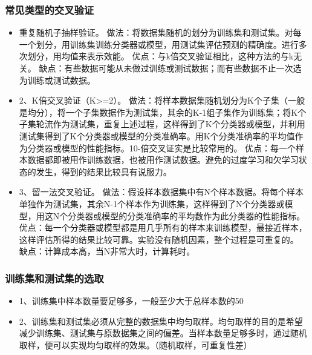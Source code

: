 \documentclass[10pt,a4paper]{ctexbook}
\begin{document}
\subsubsection{常见类型的交叉验证}
\begin{itemize}
\item 重复随机子抽样验证。
    \subitem 做法：将数据集随机的划分为训练集和测试集。对每一个划分，用训练集训练分类器或模型，用测试集评估预测的精确度。进行多次划分，用均值来表示效能。
    \subitem 优点：与k倍交叉验证相比，这种方法的与k无关。
    \subitem 缺点：有些数据可能从未做过训练或测试数据；而有些数据不止一次选为训练或测试数据。
\item 2、K倍交叉验证（K>=2）。
    \subitem 做法：将样本数据集随机划分为K个子集（一般是均分），将一个子集数据作为测试集，其余的K-1组子集作为训练集；将K个子集轮流作为测试集，重复上述过程，这样得到了K个分类器或模型，并利用测试集得到了K个分类器或模型的分类准确率。用K个分类准确率的平均值作为分类器或模型的性能指标。10-倍交叉证实是比较常用的。
    \subitem 优点：每一个样本数据都即被用作训练数据，也被用作测试数据。避免的过度学习和欠学习状态的发生，得到的结果比较具有说服力。
\item 3、留一法交叉验证。
    \subitem 做法：假设样本数据集中有N个样本数据。将每个样本单独作为测试集，其余N-1个样本作为训练集，这样得到了N个分类器或模型，用这N个分类器或模型的分类准确率的平均数作为此分类器的性能指标。
    \subitem 优点：每一个分类器或模型都是用几乎所有的样本来训练模型，最接近样本，这样评估所得的结果比较可靠。实验没有随机因素，整个过程是可重复的。
    \subitem 缺点：计算成本高，当N非常大时，计算耗时。
\end{itemize}

\subsubsection{训练集和测试集的选取}
\begin{itemize}
\item 1、训练集中样本数量要足够多，一般至少大于总样本数的50%
\item 2、训练集和测试集必须从完整的数据集中均匀取样。均匀取样的目的是希望减少训练集、测试集与原数据集之间的偏差。当样本数量足够多时，通过随机取样，便可以实现均匀取样的效果。（随机取样，可重复性差）
\end{itemize}

\ifx\mlbook\undefined
    
\end{document}
